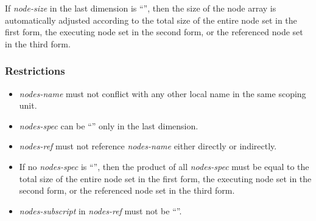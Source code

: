 %

If {\it node-size} in the last dimension is ``{\tt *}'', then the size
of the node array is automatically adjusted according to the total size
of the entire node set in the first form, the executing node set in the
second form, or the referenced node set in the third form.

\subsubsection*{Restrictions}

\begin{itemize}
\item {\it nodes-name} must not conflict with any other local name in
      the same scoping unit.
\item {\it nodes-spec} can be ``{\tt *}'' only in the last dimension.
\item {\it nodes-ref} must not reference {\it nodes-name} either
      directly or indirectly.
\item If no {\it nodes-spec} is ``{\tt *}'', then the product
      of all {\it nodes-spec} must be equal to the total size of the
      entire node set in the first form, the executing node set in the
      second form, or the referenced node set in the third form.
%
\item {\it nodes-subscript} in {\it nodes-ref} must not be ``{\tt *}''.
\end{itemize}

